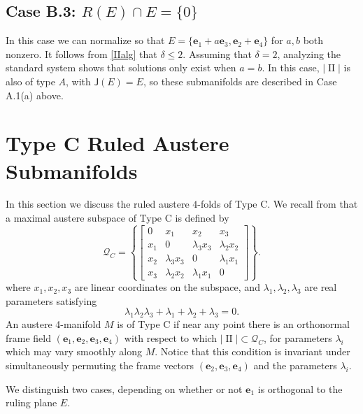 \documentclass[12pt,reqno]{amsart}
\theoremstyle{definition}
\theoremstyle{remark}
\begin{document}
\subsection*{Case B.3:  $R(E)\cap E=\{0\}$} In this case we can normalize so that
$E=\{{\mathbf e}_1 +a {\mathbf e}_3, {\mathbf e}_2 +   {\mathbf e}_4 \}$ for $a,b$ both nonzero.  It follows from \eqref{IIalg} that $\delta \leq 2$.   Assuming that $\delta=2$,
analyzing the standard system shows that solutions only exist when $a=b$.  In this case,
$|{\operatorname{II}}|$ is also of type $A$, with ${\mathsf J}(E)=E$, so these submanifolds are described in Case A.1(a) above.

\section{Type C Ruled Austere Submanifolds}

In this section we discuss the ruled austere $4$-folds of Type C. We recall from \cite{Baustere}
that a maximal austere subspace of Type C is defined by
\begin{equation}\label{defofQC}
{\mathcal Q}_C = \left\{ \begin{bmatrix} 0 & x_1 & x_2 & x_3 \\ x_1 & 0 & \lambda_3x_3& \lambda_2x_2 \\ x_2 & \lambda_3x_3 & 0 &\lambda_1x_1 \\
x_3 & \lambda_2x_2 & \lambda_1x_1  & 0 \end{bmatrix}\right\}.
\end{equation}
where $x_1,x_2,x_3$ are linear coordinates on the subspace, and $\lambda_1, \lambda_2, \lambda_3$ are real parameters satisfying
\begin{equation}\label{lambdarel}
\lambda_1 \lambda_2 \lambda_3 + \lambda_1 + \lambda_2 + \lambda_3 = 0.
\end{equation}
An austere 4-manifold $M$ is of Type C if near any point there is an orthonormal
frame field $({\mathbf e}_1, {\mathbf e}_2, {\mathbf e}_3, {\mathbf e}_4)$ with respect to which $|{\operatorname{II}} | \subset {\mathcal Q}_C$, for
parameters $\lambda_i$ which may vary smoothly along $M$.  Notice that
this condition is invariant under simultaneously permuting the frame vectors $({\mathbf e}_2, {\mathbf e}_3, {\mathbf e}_4)$
and the parameters $\lambda_i$.

We distinguish two cases, depending on whether or not ${\mathbf e}_1$ is orthogonal to the ruling plane $E$.
\end{document}
